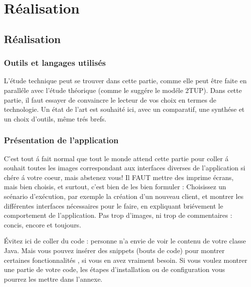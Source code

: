 \part{Réalisation}
\setcounter{chapter}{2}
\chapter{Réalisation}
\graphicspath{{Chapitre3/figures/}}
\pagestyle{fancy}
\fancyhf{}
\fancyhead[R]{\bfseries\rightmark}
\fancyfoot[R]{\thepage}
\renewcommand{\headrulewidth}{0.5pt}
\renewcommand{\footrulewidth}{0pt}
\renewcommand{\chaptermark}[1]{\markboth{\MakeUppercase{\chaptername~\thechapter. #1 }}{}}
\renewcommand{\sectionmark}[1]{\markright{\thechapter.\thesection~ #1}}

\begin{spacing}{1.2}


\section{Outils et langages utilisés}
L'étude technique peut se trouver dans cette partie, comme elle peut \^etre faite en
parall\'ele avec l'\'etude th\'eorique (comme le sugg\'ere le mod\'ele 2TUP).
Dans cette partie, il faut essayer de convaincre le lecteur de vos choix en termes de
technologie. Un \'etat de l'art est souhait\'e ici, avec un comparatif, une synth\'ese et un choix 
d'outils, m\^eme tr\'es brefs.
\section{Pr\'esentation de l'application}
C'est tout \'a fait normal que tout le monde attend cette partie pour coller \'a souhait toutes les images
correspondant aux interfaces diverses de l'application si ch\'ere \'a votre coeur, mais
abstenez vous! Il FAUT mettre des imprime \'ecrans, mais bien choisis, et surtout, c'est
bien de les bien formuler : Choisissez un sc\'enario d'ex\'ecution, par exemple la cr\'eation d'un 
nouveau client, et montrer les diff\'erentes interfaces n\'ecessaires pour le faire, en
expliquant bri\'evement le comportement de l'application. Pas trop d'images, ni trop de
commentaires : concis, encore et toujours.

\'Evitez ici de coller du code : personne n'a envie de voir le contenu de votre classe Java.
Mais  vous  pouvez ins\'erer des snippets (bouts de code) pour montrer certaines
fonctionnalit\'es \cite{YOUSFI2015}\cite{Latex}, si vous en avez vraiment besoin. Si vous voulez montrer une partie de votre code, les \'etapes d'installation ou de configuration vous pourrez les mettre dans l'annexe.

\end{spacing}

